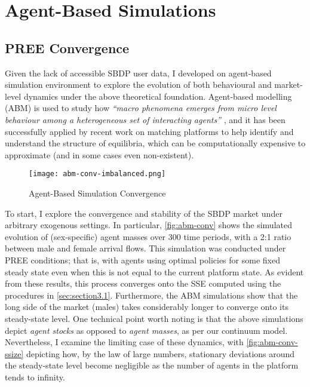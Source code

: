 \section{Agent-Based Simulations}
\label{sec:section4}  
\subsection{PREE Convergence}
Given the lack of accessible SBDP user data, I developed on agent-based simulation environment to explore the evolution of both behavioural and market-level dynamics under the above theoretical foundation. 
Agent-based modelling (ABM) is used to study how \textit{``macro phenomena emerges from micro level behaviour among a heterogeneous set of interacting agents''} \citep{janssen2005agent}, and it has been successfully applied by recent work on matching platforms \citep{immorlica2021designing} to help identify and understand the structure of equilibria, which can be computationally expensive to approximate (and in some cases even non-existent).

\begin{figure}[ht]
    \centering
    \caption{Agent-Based Simulation Convergence}
    \texttt{[image: abm-conv-imbalanced.png]}
    \label{fig:abm-conv} 
\end{figure}

To start, I explore the convergence and stability of the SBDP market under arbitrary exogenous settings. 
In particular, \autoref{fig:abm-conv} shows the simulated evolution of (sex-specific) agent masses over 300 time periods, with a 2:1 ratio between male and female arrival flows. 
This simulation was conducted under PREE conditions; that is, with agents using optimal policies for some fixed steady state even when this is not equal to the current platform state.  
As evident from these results, this process converges onto the SSE computed using the procedures in \autoref{sec:section3.1}. 
Furthermore, the ABM simulations show that the long side of the market (males) takes considerably longer to converge onto its steady-state level. 
One technical point worth noting is that the above simulations depict \textit{agent stocks} as opposed to \textit{agent masses}, as per our continuum model. 
Nevertheless, I examine the limiting case of these dynamics, with \autoref{fig:abm-conv-ssize} depicting how, by the law of large numbers, stationary deviations around the steady-state level become negligible as the number of agents in the platform tends to infinity. 

